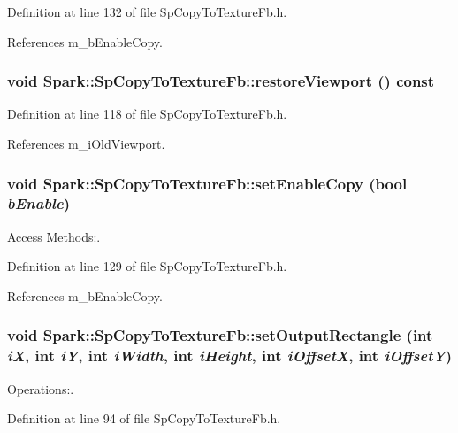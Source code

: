 Definition at line 132 of file Sp\-Copy\-To\-Texture\-Fb.h.

References m\_\-b\-Enable\-Copy.
\subsubsection{\setlength{\rightskip}{0pt plus 5cm}void Spark::Sp\-Copy\-To\-Texture\-Fb::restore\-Viewport () const\hspace{0.3cm}{\tt  [inline]}}\label{classSpark_1_1SpCopyToTextureFb_a7}


Definition at line 118 of file Sp\-Copy\-To\-Texture\-Fb.h.

References m\_\-i\-Old\-Viewport.
\subsubsection{\setlength{\rightskip}{0pt plus 5cm}void Spark::Sp\-Copy\-To\-Texture\-Fb::set\-Enable\-Copy (bool {\em b\-Enable})\hspace{0.3cm}{\tt  [inline]}}\label{classSpark_1_1SpCopyToTextureFb_a8}


Access Methods:. 

Definition at line 129 of file Sp\-Copy\-To\-Texture\-Fb.h.

References m\_\-b\-Enable\-Copy.
\subsubsection{\setlength{\rightskip}{0pt plus 5cm}void Spark::Sp\-Copy\-To\-Texture\-Fb::set\-Output\-Rectangle (int {\em i\-X}, int {\em i\-Y}, int {\em i\-Width}, int {\em i\-Height}, int {\em i\-Offset\-X}, int {\em i\-Offset\-Y})\hspace{0.3cm}{\tt  [inline]}}\label{classSpark_1_1SpCopyToTextureFb_a4}


Operations:. 

Definition at line 94 of file Sp\-Copy\-To\-Texture\-Fb.h.


